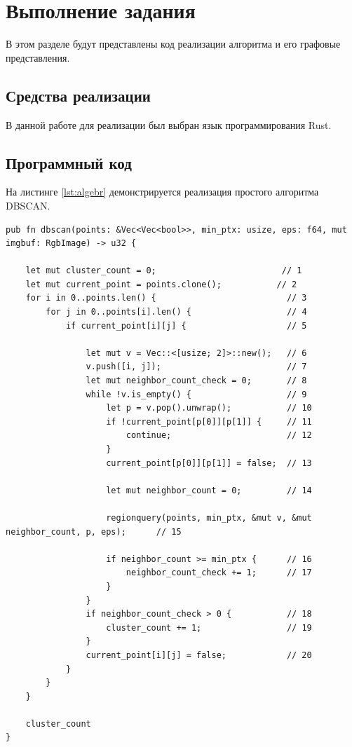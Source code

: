 \chapter{Выполнение задания}

В этом разделе будут представлены код реализации алгоритма и его графовые представления.


\section{Средства реализации}

В данной работе для реализации был выбран язык программирования Rust.

\section{Программный код}

На листинге \ref{lst:algebr} демонстрируется реализация простого алгоритма DBSCAN. 
\newpage

\captionsetup{singlelinecheck = false, justification=raggedright}
\begin{lstlisting}[label=lst:algebr,caption=Реализация простого алгоритма DBSCAN]
pub fn dbscan(points: &Vec<Vec<bool>>, min_ptx: usize, eps: f64, mut imgbuf: RgbImage) -> u32 {
	
	let mut cluster_count = 0;                         // 1
	let mut current_point = points.clone();           // 2                                            
	for i in 0..points.len() {  						// 3
		for j in 0..points[i].len() {					// 4
			if current_point[i][j] {					// 5
				
				let mut v = Vec::<[usize; 2]>::new();  	// 6
				v.push([i, j]);							// 7
				let mut neighbor_count_check = 0;		// 8
				while !v.is_empty() {					// 9
					let p = v.pop().unwrap();			// 10
					if !current_point[p[0]][p[1]] { 	// 11
						continue;						// 12
					}
					current_point[p[0]][p[1]] = false;	// 13
					
					let mut neighbor_count = 0; 		// 14
					
					regionquery(points, min_ptx, &mut v, &mut neighbor_count, p, eps);		// 15
					
					if neighbor_count >= min_ptx {		// 16
						neighbor_count_check += 1;		// 17
					}
				}
				if neighbor_count_check > 0 { 			// 18
					cluster_count += 1;					// 19
				}
				current_point[i][j] = false;			// 20
			}
		}
	}   
	
	cluster_count
}




\end{lstlisting}


